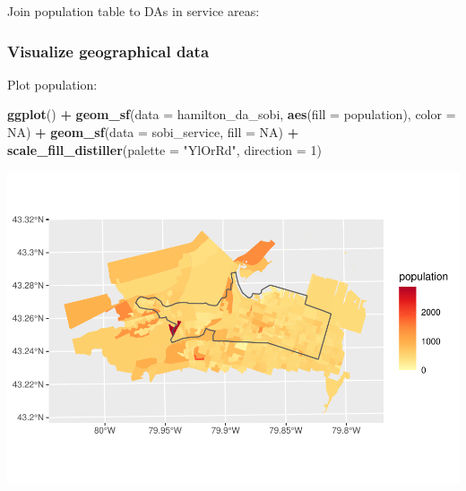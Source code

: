 \documentclass[
]{article}
\newenvironment{Shaded}{\begin{snugshade}}{\end{snugshade}}
\newcommand{\DataTypeTok}[1]{\textcolor[rgb]{0.13,0.29,0.53}{#1}}
\newcommand{\DecValTok}[1]{\textcolor[rgb]{0.00,0.00,0.81}{#1}}
\newcommand{\KeywordTok}[1]{\textcolor[rgb]{0.13,0.29,0.53}{\textbf{#1}}}
\newcommand{\NormalTok}[1]{#1}
\newcommand{\OperatorTok}[1]{\textcolor[rgb]{0.81,0.36,0.00}{\textbf{#1}}}
\newcommand{\OtherTok}[1]{\textcolor[rgb]{0.56,0.35,0.01}{#1}}
\newcommand{\StringTok}[1]{\textcolor[rgb]{0.31,0.60,0.02}{#1}}
\begin{document}
Join population table to DAs in service areas:

\begin{Shaded}
\end{Shaded}

\hypertarget{visualize-geographical-data}{%
\subsubsection{Visualize geographical
data}\label{visualize-geographical-data}}

Plot population:

\begin{Shaded}
\begin{Highlighting}[]
\KeywordTok{ggplot}\NormalTok{() }\OperatorTok{+}
\StringTok{  }\KeywordTok{geom_sf}\NormalTok{(}\DataTypeTok{data =}\NormalTok{ hamilton_da_sobi,}
          \KeywordTok{aes}\NormalTok{(}\DataTypeTok{fill =}\NormalTok{ population),}
          \DataTypeTok{color =} \OtherTok{NA}\NormalTok{) }\OperatorTok{+}
\StringTok{  }\KeywordTok{geom_sf}\NormalTok{(}\DataTypeTok{data =}\NormalTok{ sobi_service,}
          \DataTypeTok{fill =} \OtherTok{NA}\NormalTok{) }\OperatorTok{+}
\StringTok{  }\KeywordTok{scale_fill_distiller}\NormalTok{(}\DataTypeTok{palette =} \StringTok{"YlOrRd"}\NormalTok{, }\DataTypeTok{direction =} \DecValTok{1}\NormalTok{)}
\end{Highlighting}
\end{Shaded}

\includegraphics{00-Data-Processing-Example_files/figure-latex/unnamed-chunk-52-1.pdf}
\end{document}
